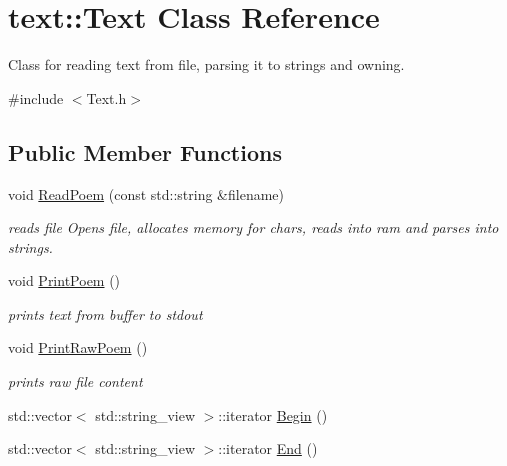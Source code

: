 \hypertarget{classtext_1_1Text}{}\section{text\+:\+:Text Class Reference}
\label{classtext_1_1Text}


Class for reading text from file, parsing it to strings and owning.  




{\ttfamily \#include $<$Text.\+h$>$}

\subsection*{Public Member Functions}
\begin{DoxyCompactItemize}
\item 
void \hyperlink{classtext_1_1Text_a01085c36a7d94374043d20b7be2cfab1}{Read\+Poem} (const std\+::string \&filename)
\begin{DoxyCompactList}\small\item\em reads file Opens file, allocates memory for chars, reads into ram and parses into strings. \end{DoxyCompactList}\item 
\mbox{\label{classtext_1_1Text_ac301f67b075febf7ef8d8dfb39c5fc7f}} 
void \hyperlink{classtext_1_1Text_ac301f67b075febf7ef8d8dfb39c5fc7f}{Print\+Poem} ()
\begin{DoxyCompactList}\small\item\em prints text from buffer to stdout \end{DoxyCompactList}\item 
\mbox{\label{classtext_1_1Text_a93696ba617d1c9abb3588f8e50568d82}} 
void \hyperlink{classtext_1_1Text_a93696ba617d1c9abb3588f8e50568d82}{Print\+Raw\+Poem} ()
\begin{DoxyCompactList}\small\item\em prints raw file content \end{DoxyCompactList}\item 
std\+::vector$<$ std\+::string\+\_\+view $>$\+::iterator \hyperlink{classtext_1_1Text_afc03e19cf74bd07cb0dda78e321b974e}{Begin} ()
\item 
std\+::vector$<$ std\+::string\+\_\+view $>$\+::iterator \hyperlink{classtext_1_1Text_ab02329afe5da1faca91732bd880dea3b}{End} ()
\end{DoxyCompactItemize}


